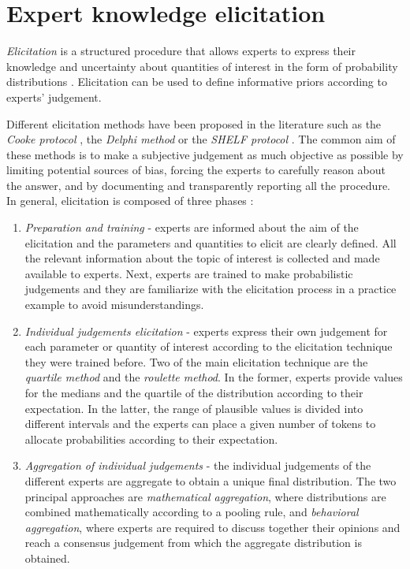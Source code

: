 \documentclass[graybox]{svmult}
\begin{document}
\section{Expert knowledge elicitation}
\label{sec:expert_elicitation}

\emph{Elicitation} is a structured procedure that allows experts to express their knowledge and uncertainty about quantities of interest in the form of probability distributions \cite{ohaganExpertKnowledgeElicitation2019}. Elicitation can be used to define informative priors according to  experts' judgement.

Different elicitation methods have been proposed in the literature such as the \emph{Cooke protocol} \cite{cookeExpertsUncertaintyOpinion1991}, the \emph{Delphi method} \cite{roweDelphiTechniqueForecasting1999} or the \emph{SHELF protocol} \cite{oakleySHELFSheffieldElicitation2016}. The common aim of these methods is to make a subjective judgement as much objective as possible by limiting potential sources of bias, forcing the experts to carefully reason about the answer, and by documenting and transparently reporting all the procedure. In general, elicitation is composed of three phases \cite{ohaganUncertainJudgementsEliciting2006}:

\begin{enumerate}
	\item{\emph{Preparation and training} - experts are informed about  the aim of the elicitation and the parameters and quantities to elicit are clearly defined. All the relevant information about the topic of interest is collected and made available to experts. Next, experts are trained to make probabilistic judgements and they are familiarize with the elicitation process in a practice example to avoid misunderstandings. }
	\item{\emph{Individual judgements elicitation} - experts express their own judgement for each parameter or quantity of interest according to the elicitation technique they were trained before. Two of the main elicitation technique are the \emph{quartile method} and the \emph{roulette method}. In the former, experts provide values for the medians  and the quartile of the distribution according to their expectation. In the latter, the range of plausible values is divided into different intervals and the experts can place a given number of tokens to allocate probabilities according to  their expectation.}
	\item{\emph{Aggregation of individual judgements} - the individual judgements of the different experts are aggregate to obtain a unique final distribution. The two principal approaches are \emph{mathematical  aggregation}, where distributions are combined mathematically according to a pooling rule, and \emph{behavioral aggregation}, where experts are required to discuss together their opinions and reach a consensus judgement from which the aggregate distribution is obtained.}
\end{enumerate}
\end{document}
